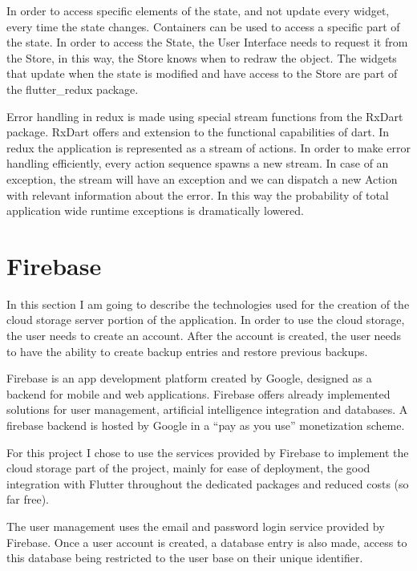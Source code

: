 \documentclass[a4paper,12pt]{report}
\begin{document}
In order to access specific elements of the state, and not update every widget,
every time the state changes. Containers can be used to access a specific part
of the state. In order to access the State, the User Interface needs to request
it from the Store, in this way, the Store knows when to redraw the object. The
widgets that update when the state is modified and have access to the Store are
part of the flutter\_redux package\cite{flutterReduxDocs}.

Error handling in redux is made using special stream functions from the RxDart
package\cite{rxDartDocs}. RxDart offers and extension to the functional
capabilities of dart. In redux the application is represented as a stream of
actions. In order to make error handling efficiently, every action sequence
spawns a new stream. In case of an exception, the stream will have an exception
and we can dispatch a new Action with relevant information about the error. In
this way the probability of total application wide runtime exceptions is
dramatically lowered.

\section{Firebase}

In this section I am going to describe the technologies used for the creation
of the cloud storage server portion of the application. In order to use the
cloud storage, the user needs to create an account. After the account is
created, the user needs to have the ability to create backup entries and
restore previous backups.

Firebase\cite{firebaseDocs} is an app development platform created by Google,
designed as a backend for mobile and web applications. Firebase offers already
implemented solutions for user management, artificial intelligence integration
and databases. A firebase backend is hosted by Google in a ``pay as you use''
monetization scheme.

For this project I chose to use the services provided by Firebase to implement
the cloud storage part of the project, mainly for ease of deployment, the good
integration with Flutter throughout the dedicated packages and reduced costs
(so far free).

The user management uses the email and password login service provided by
Firebase. Once a user account is created, a database entry is also made, access
to this database being restricted to the user base on their unique identifier.
\end{document}
